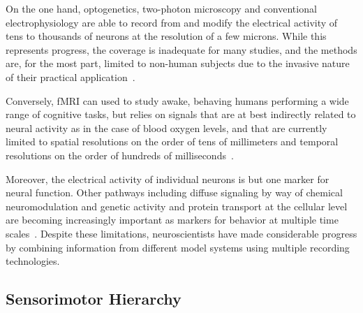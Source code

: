 \documentclass[letterpaper,11pt]{article}
\begin{document}
On the one hand, optogenetics, two-photon microscopy and conventional electrophysiology are able to record from and modify the electrical activity of tens to thousands of neurons at the resolution of a few microns. While this represents progress, the coverage is inadequate for many studies, and the methods are, for the most part, limited to non-human subjects due to the invasive nature of their practical application~\cite{DombeckandTankCSH-11,BoydenBIOLOGY-11,ZhangetalNATURE-10,YizharetalNEURON-11}.

Conversely, fMRI can used to study awake, behaving humans performing a wide range of cognitive tasks, but relies on signals that are at best indirectly related to neural activity as in the case of blood oxygen levels, and that are currently limited to spatial resolutions on the order of tens of millimeters and temporal resolutions on the order of hundreds of milliseconds~\cite{GoenseetalFiCN-16,GloverPMC-11,BuxtonetalNEUROIMAGING-04}.

Moreover, the electrical activity of individual neurons is but one marker for neural function. Other pathways including diffuse signaling by way of chemical neuromodulation and genetic activity and protein transport at the cellular level are becoming increasingly important as markers for behavior at multiple time scales~\cite{WangandWangFiP-19}. Despite these limitations, neuroscientists have made considerable progress by combining information from different model systems using multiple recording technologies.


\subsection{Sensorimotor Hierarchy}
\label{subsection_sensorimotor_hierarchy}



\end{document}

